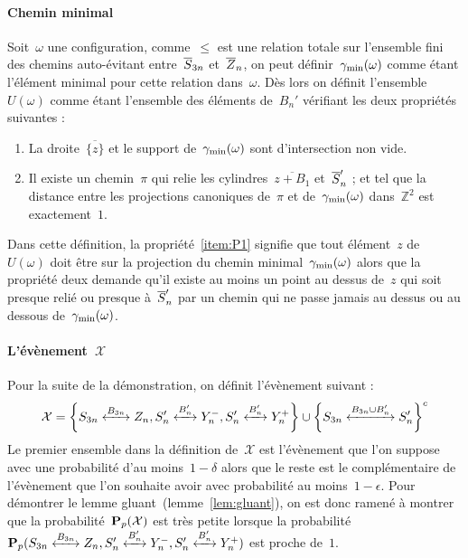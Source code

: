 		\paragraph{Chemin minimal}
			Soit~$\omega$ une configuration, comme~$\leq$ est une relation totale sur l'ensemble fini des chemins auto-évitant entre~$\SnB$ et~$\ZnB$, on peut définir~$\Cmin$ comme étant l'élément minimal pour cette relation dans~$\omega$. Dès lors on définit l'ensemble~$U(\omega)$ comme étant l'ensemble des éléments de~$B_n'$ vérifiant les deux propriétés suivantes :
			\begin{enumerate}[label=P\arabic*.]
				\item\label{item:P1} La droite~$\overline{\{z\}}$ et le support de~$\Cmin$ sont d'intersection non vide.
				\item\label{item:P2} Il existe un chemin~$\pi$ qui relie les cylindres~$\overline{z+B_1}$ et~$\SnB[n]'$ ; et tel que la distance entre les projections canoniques de~$\pi$ et de~$\Cmin$ dans~$\mathbb{Z}^2$ est exactement~$1$.
			\end{enumerate}
			Dans cette définition, la propriété~\ref{item:P1} signifie que tout élément~$z$ de~$U(\omega)$ doit être sur la projection du chemin minimal~$\Cmin$ alors que la propriété deux demande qu'il existe au moins un point au dessus de~$z$ qui soit presque relié ou presque à~$\SnB[n]'$ par un chemin qui ne passe jamais au dessus ou au dessous de~$\Cmin$.
		
		\boldmath
		\paragraph{L'évènement~$\mathcal{X}$} Pour la suite de la démonstration, on définit l'évènement suivant :
		\unboldmath
		\[
			\mathcal{X} =
			\left\{
				\relie[B_{3n}]{S_{3n}}{Z_n},
				\relie[B_n']{S_n'}{Y_n^-},
				\relie[B_n']{S_n'}{Y_n^+}
			\right\}
			\cup
			\left\{
				\relie[B_{3n}\cup B_n']{S_{3n}}{S_n'}
			\right\}^c
		\]
		Le premier ensemble dans la définition de~$\mathcal{X}$ est l'évènement que l'on suppose avec une probabilité d'au moins~$1-\delta$ alors que le reste est le complémentaire de l'évènement que l'on souhaite avoir avec probabilité au moins~$1-\epsilon$. Pour démontrer le lemme gluant~(lemme~\ref{lem:gluant}), on est donc ramené à montrer que la probabilité~$\PpSP(\mathcal{X})$ est très petite lorsque la probabilité~$\PpSP(\relie[B_{3n}]{S_{3n}}{Z_n}, \relie[B_n']{S_n'}{Y_n^-}, \relie[B_n']{S_n'}{Y_n^+})$ est proche de~$1$.



